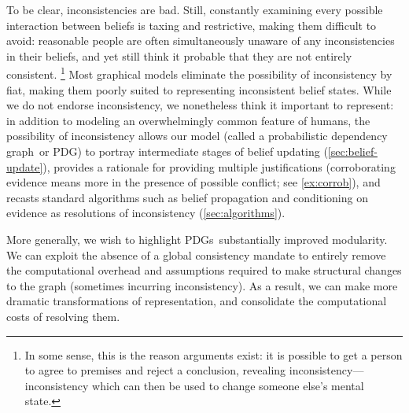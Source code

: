 \documentclass{article}
\newcommand{\modelname}{probabilistic dependency graph}
\newcommand{\MN}{PDG}
\newcommand{\MNs}{\MN s}
\begin{document}
	To be clear, inconsistencies are bad. Still, constantly examining every possible interaction between beliefs is taxing and restrictive, making them difficult to avoid: reasonable people are often simultaneously unaware of any inconsistencies in their beliefs, and yet still think it probable that they are not entirely consistent.%
		\footnote{In some sense, this is the reason arguments exist: it is possible to get a person to agree to premises and reject a conclusion, revealing inconsistency---inconsistency which can then be used to change someone else's mental state. }		
	Most graphical models eliminate the possibility of inconsistency by fiat, %
	making them poorly suited to representing inconsistent belief states.
	While we do not endorse inconsistency, we nonetheless think it important to represent: in addition to modeling an overwhelmingly common feature of humans, the possibility of inconsistency 
	allows our model (called a \modelname\ or \MN)
	to portray intermediate stages of belief updating (\cref{sec:belief-update}), 
	provides a rationale for providing multiple justifications 
	(corroborating evidence means more in the presence of possible conflict; see \cref{ex:corrob}),
	and	recasts standard algorithms such as belief propagation and conditioning on evidence as resolutions of inconsistency (\cref{sec:algorithms}). 
	
	
	
	More generally, we wish to highlight \MNs\ substantially improved modularity.
	We can exploit the absence of a global consistency mandate to entirely remove the computational overhead and assumptions required to make structural changes to the graph (sometimes incurring inconsistency). 
	As a result, we can make more dramatic transformations of representation, and consolidate the computational costs of resolving them.
	
\end{document}

